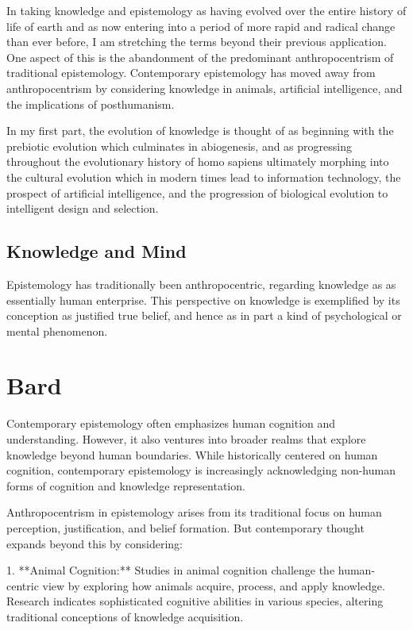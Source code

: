 \documentclass[10pt,titlepage]{book}
\begin{document}
In taking knowledge and epistemology as having evolved over the entire history of life of earth and as now entering into a period of more rapid and radical change than ever before, I am stretching the terms beyond their previous application.
One aspect of this is the abandonment of the predominant anthropocentrism of traditional epistemology.
Contemporary epistemology has moved away from anthropocentrism by considering knowledge in animals, artificial intelligence, and the implications of posthumanism.

In my first part, the evolution of knowledge is thought of as beginning with the prebiotic evolution which culminates in abiogenesis, and as progressing throughout the evolutionary history of homo sapiens ultimately morphing into the cultural evolution which in modern times lead to information technology, the prospect of artificial intelligence, and the progression of biological evolution to intelligent design and selection.

\subsection{Knowledge and Mind}

Epistemology has traditionally been anthropocentric, regarding knowledge as as essentially human enterprise.
This perspective on knowledge is exemplified by its conception as justified true belief, and hence as in part a kind of psychological or mental phenomenon.

\section{Bard}

Contemporary epistemology often emphasizes human cognition and understanding. However, it also ventures into broader realms that explore knowledge beyond human boundaries. While historically centered on human cognition, contemporary epistemology is increasingly acknowledging non-human forms of cognition and knowledge representation.

Anthropocentrism in epistemology arises from its traditional focus on human perception, justification, and belief formation. But contemporary thought expands beyond this by considering:

1. **Animal Cognition:** Studies in animal cognition challenge the human-centric view by exploring how animals acquire, process, and apply knowledge. Research indicates sophisticated cognitive abilities in various species, altering traditional conceptions of knowledge acquisition.
\end{document}
